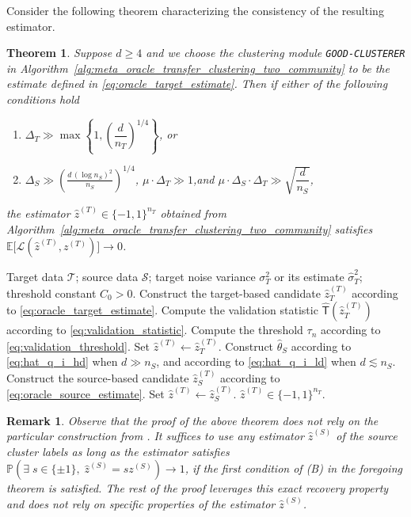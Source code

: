 \documentclass[10pt]{article}
\newtheorem{theorem}{Theorem}
\newtheorem{remark}{Remark}
\newcommand{\Ebb}{\mathbb E}
\newcommand{\wh}{\widehat}
\newcommand{\calL}{\mathcal L}
\newcommand{\calT}{\mathcal T}
\newcommand{\trg}{T}
\newcommand{\nT}{n_{\trg}}
\newcommand{\sigmaT}{\sigma_{\trg}}
\newcommand{\ztar}{z^{(\trg)}}
\newcommand{\hatztar}{\wh{z}^{(\trg)}}
\newcommand{\DeltaT}{\Delta_{\trg}}
\newcommand{\rmT}{\mathsf{T}}
\newcommand{\calS}{\mathcal S}
\newcommand{\src}{S}
\newcommand{\nS}{n_{\src}}
\newcommand{\zsrc}{z^{(\src)}}
\newcommand{\DeltaS}{\Delta_{\src}}
\newcommand{\hatthetaS}{\wh{\theta}_S}
\begin{document}
 Consider the following theorem characterizing the consistency of the resulting estimator.
\begin{theorem}
\label{thm:correct_choose}
Suppose $d \ge 4$ and we choose the clustering module \texttt{GOOD-CLUSTERER} in Algorithm~\ref{alg:meta_oracle_transfer_clustering_two_community} to be the estimate defined in \eqref{eq:oracle_target_estimate}.
Then if either of the following conditions hold 
\begin{enumerate}[label=\emph{(\Alph*)}]
    \item $\DeltaT\gg\max\!\left\{1,\left(\dfrac{d}{\nT}\right)^{1/4}\right\}$, \quad\emph{or}
    \item $\DeltaS \gg \left(\frac{d\,(\log \nS)^2}{\nS}\right)^{1/4}$,\quad
          $\mu\cdot\DeltaT\gg 1$,\quad\emph{and}\quad
          $\mu\cdot\DeltaS\cdot\DeltaT\gg\!\sqrt{\dfrac{d}{\nS}}$,
\end{enumerate}
the estimator $\hatztar \in \{-1,1\}^{\nT}$ obtained from Algorithm~\ref{alg:meta_oracle_transfer_clustering_two_community} satisfies $\Ebb\bigl[\calL(\hatztar, \ztar)\bigr] \to 0$.
\end{theorem}

\begin{algorithm}[tb]
\caption{Adaptive Transfer-Assisted Clustering for Two Communities}
\label{alg:adaptive_transfer_clustering_two_community}
\begin{algorithmic}[1]
\Require Target data $\calT$; source data $\calS$; target noise variance
$\sigmaT^2$ or its estimate $\wh\sigmaT^2$; threshold constant $C_0>0$.
\State Construct the target-based candidate
$\hatztar_{\trg}$ according to
\eqref{eq:oracle_target_estimate}.
\State Compute the validation statistic
$\wh{\rmT}(\hatztar_{\trg})$ according to
\eqref{eq:validation_statistic}.
\State Compute the threshold $\tau_n$ according to
\eqref{eq:validation_threshold}.
\If{$|\wh{\rmT}(\hatztar_{\trg})|>\tau_n$}
    \State Set $\hatztar\gets\hatztar_{\trg}$.
\Else
    \State Construct $\hatthetaS$ according to
    \eqref{eq:hat_q_i_hd} when $d\gg\nS$, and according to
    \eqref{eq:hat_q_i_ld} when $d\lesssim\nS$.
    \State Construct the source-based candidate
    $\hatztar_{\src}$ according to
    \eqref{eq:oracle_source_estimate}.
    \State Set $\hatztar\gets\hatztar_{\src}$.
\EndIf
\Output $\hatztar\in\{-1,1\}^{\nT}$.
\end{algorithmic}
\end{algorithm}

\begin{remark}
    Observe that the proof of the above theorem does not rely on the particular construction from \cite{Ndaoud2022}. It suffices to use any estimator $\wh z^{(\src)}$ of the source cluster labels as long as the estimator satisfies $\mathbb P\left(\exists\;s \in \{\pm 1\},\;\wh z^{(\src)}=s\zsrc\right) \to 1$, if the first condition of (B) in the foregoing theorem is satisfied. The rest of the proof leverages this exact recovery property and does not rely on specific properties of the estimator $\wh z^{(\src)}$.
\end{remark}
\end{document}
